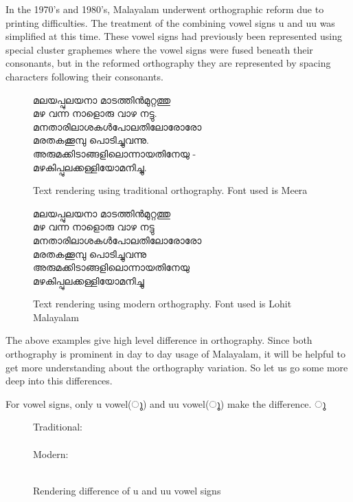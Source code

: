 In the 1970's and 1980's, Malayalam underwent orthographic reform due to
printing difficulties. The treatment of the combining vowel signs u
and uu was simplified at this time. These vowel signs had previously
been represented using special cluster graphemes where the vowel signs
were fused beneath their consonants, but in the reformed orthography
they are represented by spacing characters following their consonants.


\begin{figure}[h]
   {\meera\large  മലയപ്പുലയനാ മാടത്തിന്‍മുറ്റത്തു\\
മഴ വന്ന നാളൊരു വാഴ നട്ടു.\\
മനതാരിലാശകൾപോലതിലോരോരോ \\
മരതകക്കൂമ്പു പൊടിച്ചുവന്നു.\\
അരുമക്കിടാങ്ങളിലൊന്നായതിനേയു -\\
മഴകിപ്പുലക്കള്ളിയോമനിച്ചു.}
   \caption{Text rendering using traditional orthography. Font used is Meera }
\end{figure}

\begin{figure}[h]
   {\lohitmalayalam\large  മലയപ്പുലയനാ മാടത്തിന്‍മുറ്റത്തു\\
മഴ വന്ന നാളൊരു വാഴ നട്ടു\\
മനതാരിലാശകൾപോലതിലോരോരോ \\
മരതകക്കൂമ്പു പൊടിച്ചുവന്നു\\
അരുമക്കിടാങ്ങളിലൊന്നായതിനേയു\\
മഴകിപ്പുലക്കള്ളിയോമനിച്ചു}
   \caption{Text rendering using modern orthography. Font used is Lohit
Malayalam}
\end{figure}

The above examples give high level difference in orthography.
Since both orthography is prominent in day to day usage of Malayalam, it will
be helpful to get more
understanding about the orthography variation. So let us go some more deep into
this differences.

For vowel signs, only u vowel({\meera ു}) and uu vowel({\meera ൂ})  make the
difference. {\meera ു}
\begin{figure}[h]
   Traditional: \\{ }\\
 Modern:\\ \\
   \caption{Rendering difference of u and uu vowel signs}
\end{figure}

